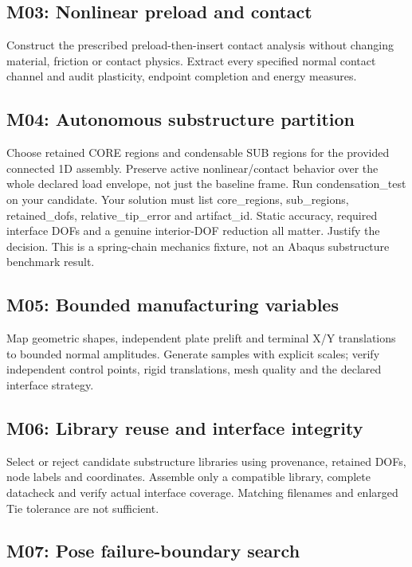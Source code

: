 \documentclass[UTF8,a4paper,11pt,fontset=windows]{ctexart}
\begin{document}
\subsection{M03: Nonlinear preload and contact}

Construct the prescribed preload-then-insert contact analysis without changing material, friction or contact physics. Extract every specified normal contact channel and audit plasticity, endpoint completion and energy measures.

\subsection{M04: Autonomous substructure partition}

Choose retained CORE regions and condensable SUB regions for the provided connected 1D assembly. Preserve active nonlinear/contact behavior over the whole declared load envelope, not just the baseline frame. Run condensation\_test on your candidate. Your solution must list core\_regions, sub\_regions, retained\_dofs, relative\_tip\_error and artifact\_id. Static accuracy, required interface DOFs and a genuine interior-DOF reduction all matter. Justify the decision. This is a spring-chain mechanics fixture, not an Abaqus substructure benchmark result.

\subsection{M05: Bounded manufacturing variables}

Map geometric shapes, independent plate prelift and terminal X/Y translations to bounded normal amplitudes. Generate samples with explicit scales; verify independent control points, rigid translations, mesh quality and the declared interface strategy.

\subsection{M06: Library reuse and interface integrity}

Select or reject candidate substructure libraries using provenance, retained DOFs, node labels and coordinates. Assemble only a compatible library, complete datacheck and verify actual interface coverage. Matching filenames and enlarged Tie tolerance are not sufficient.

\subsection{M07: Pose failure-boundary search}
\end{document}
